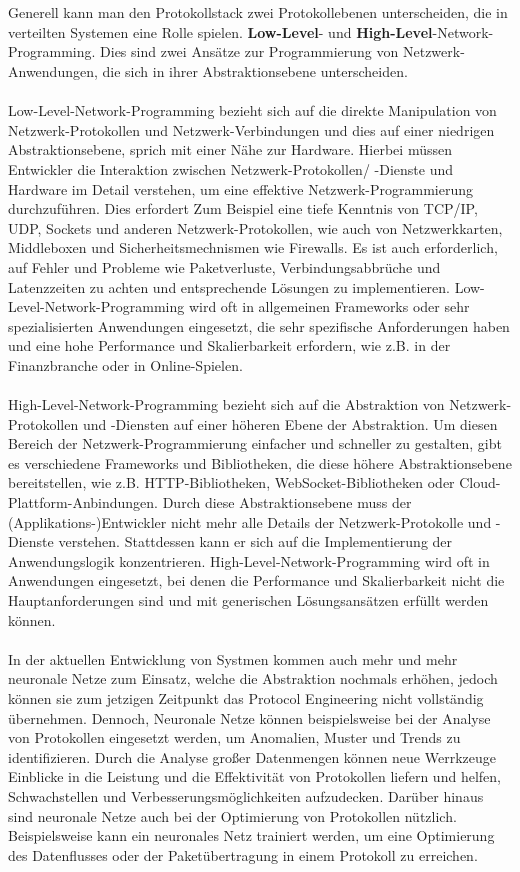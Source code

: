 \documentclass[../vs-script-first-v01.tex]{subfiles}
\begin{document}
\\\\
Generell kann man den Protokollstack zwei Protokollebenen unterscheiden, die in verteilten Systemen eine Rolle spielen. \textbf{Low-Level}- und \textbf{High-Level}-Network-Programming. Dies sind zwei Ansätze zur Programmierung von Netzwerk-Anwendungen, die sich in ihrer Abstraktionsebene unterscheiden.
\\\\
Low-Level-Network-Programming bezieht sich auf die direkte Manipulation von Netzwerk-Protokollen und Netzwerk-Verbindungen und dies auf einer niedrigen Abstraktionsebene, sprich mit einer Nähe zur Hardware. Hierbei müssen Entwickler die Interaktion zwischen Netzwerk-Protokollen/ -Dienste und Hardware im Detail verstehen, um eine effektive Netzwerk-Programmierung durchzuführen. Dies erfordert Zum Beispiel eine tiefe Kenntnis von TCP/IP, UDP, Sockets und anderen Netzwerk-Protokollen, wie auch von Netzwerkkarten, Middleboxen und Sicherheitsmechnismen wie Firewalls. Es ist auch erforderlich, auf Fehler und Probleme wie Paketverluste, Verbindungsabbrüche und Latenzzeiten zu achten und entsprechende Lösungen zu implementieren. Low-Level-Network-Programming wird oft in allgemeinen Frameworks oder sehr spezialisierten Anwendungen eingesetzt, die sehr spezifische Anforderungen haben und eine hohe Performance und Skalierbarkeit erfordern, wie z.B. in der Finanzbranche oder in Online-Spielen.
\\\\
High-Level-Network-Programming bezieht sich auf die Abstraktion von Netzwerk-Protokollen und -Diensten auf einer höheren Ebene der Abstraktion. Um diesen Bereich der Netzwerk-Programmierung einfacher und schneller zu gestalten, gibt es verschiedene Frameworks und Bibliotheken, die diese höhere Abstraktionsebene bereitstellen, wie z.B. HTTP-Bibliotheken, WebSocket-Bibliotheken oder Cloud-Plattform-Anbindungen. Durch diese Abstraktionsebene muss der (Applikations-)Entwickler nicht mehr alle Details der Netzwerk-Protokolle und -Dienste verstehen. Stattdessen kann er sich auf die Implementierung der Anwendungslogik konzentrieren. High-Level-Network-Programming wird oft in Anwendungen eingesetzt, bei denen die Performance und Skalierbarkeit nicht die Hauptanforderungen sind und mit generischen Lösungsansätzen erfüllt werden können.  
\\\\
In der aktuellen Entwicklung von Systmen kommen auch mehr und mehr neuronale Netze zum Einsatz, welche die Abstraktion nochmals erhöhen, jedoch können sie zum jetzigen Zeitpunkt das Protocol Engineering nicht vollständig übernehmen. Dennoch, Neuronale Netze können beispielsweise bei der Analyse von Protokollen eingesetzt werden, um Anomalien, Muster und Trends zu identifizieren. Durch die Analyse großer Datenmengen können neue Werrkzeuge Einblicke in die Leistung und die Effektivität von Protokollen liefern und helfen, Schwachstellen und Verbesserungsmöglichkeiten aufzudecken. Darüber hinaus sind neuronale Netze auch bei der Optimierung von Protokollen nützlich. Beispielsweise kann ein neuronales Netz trainiert werden, um eine Optimierung des Datenflusses oder der Paketübertragung in einem Protokoll zu erreichen.
\end{document}
